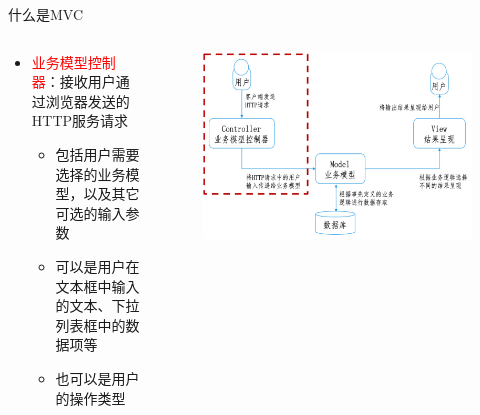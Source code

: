 \begin{frame}{什么是MVC}
\begin{columns}
\begin{column}{0.4\textwidth}
\begin{itemize}
    \item \textcolor{red}{业务模型控制器}：接收用户通过浏览器发送的HTTP服务请求
    \begin{itemize}
        \item 包括用户需要选择的业务模型，以及其它可选的输入参数
        \item 可以是用户在文本框中输入的文本、下拉列表框中的数据项等
        \item 也可以是用户的操作类型
    \end{itemize}
\end{itemize}
\end{column}

\begin{column}{0.6\textwidth}
\begin{figure}
    \centering
    \includegraphics[width=\textwidth]{figure/fig-16.jpg}
\end{figure}
\end{column}

\end{columns}
\end{frame}


